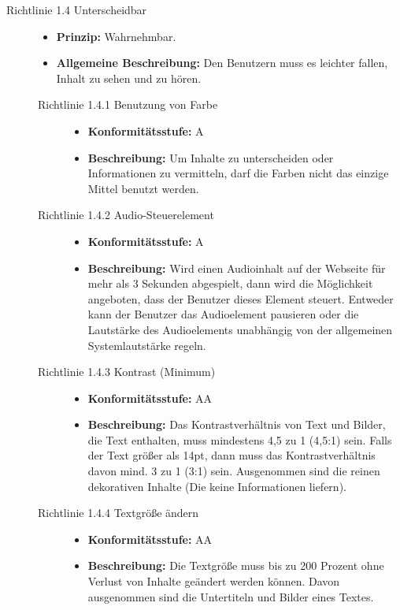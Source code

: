 \begin{description}
	\item[Richtlinie 1.4 Unterscheidbar]\hfill
	\begin{itemize}
		\item \textbf{Prinzip:} Wahrnehmbar.
		\item \textbf{Allgemeine Beschreibung:} Den Benutzern muss es leichter fallen, Inhalt zu sehen und zu hören.
	\end{itemize}
	
	\begin{description}
		\item[Richtlinie 1.4.1 Benutzung von Farbe]\hfill
		\begin{itemize}
			\item \textbf{Konformitätsstufe:} A
			\item \textbf{Beschreibung:} Um Inhalte zu unterscheiden oder Informationen zu vermitteln, darf die Farben nicht das einzige Mittel benutzt werden.
		\end{itemize}
		
		\item[Richtlinie 1.4.2 Audio-Steuerelement]\hfill
		\begin{itemize}
			\item \textbf{Konformitätsstufe:} A
			\item \textbf{Beschreibung:} Wird einen Audioinhalt auf der Webseite für mehr als 3 Sekunden abgespielt, dann wird die Möglichkeit angeboten, dass der 
			Benutzer dieses Element steuert. Entweder kann der Benutzer das Audioelement pausieren oder die Lautstärke des Audioelements unabhängig von der 
			allgemeinen Systemlautstärke regeln.
		\end{itemize}
		
		\item[Richtlinie 1.4.3 Kontrast (Minimum)]\hfill
		\begin{itemize}
			\item \textbf{Konformitätsstufe:} AA
			\item \textbf{Beschreibung:} Das Kontrastverhältnis von Text und Bilder, die Text enthalten, muss mindestens 4,5 zu 1 (4,5:1) sein. Falls der Text größer 
			als 14pt, dann muss das Kontrastverhältnis davon mind. 3 zu 1 (3:1) sein. Ausgenommen sind die reinen dekorativen Inhalte (Die keine Informationen liefern).
		\end{itemize}
		
		\item[Richtlinie 1.4.4 Textgröße ändern]\hfill
		\begin{itemize}
			\item \textbf{Konformitätsstufe:} AA
			\item \textbf{Beschreibung:} Die Textgröße muss bis zu 200 Prozent ohne Verlust von Inhalte geändert werden können. Davon ausgenommen sind die 
			Untertiteln und Bilder eines Textes.
		\end{itemize}
		

\end{description}
\end{description}
